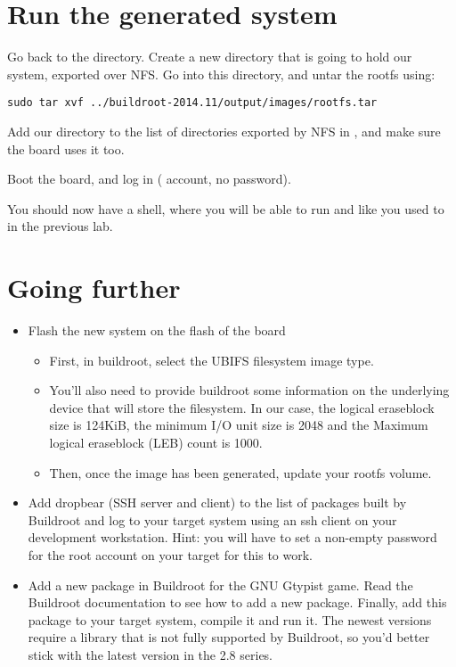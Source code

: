 \section{Run the generated system}

Go back to the  directory. Create
a new  directory that is going to hold our system,
exported over NFS. Go into this directory, and untar the rootfs using:

\begin{verbatim}
sudo tar xvf ../buildroot-2014.11/output/images/rootfs.tar
\end{verbatim}

Add our  directory to the list of directories exported
by NFS in , and make sure the board uses it too.

Boot the board, and log in ( account, no password).

You should now have a shell, where you will be able to run
 and  like you used to in the previous
lab.

\section{Going further}

\begin{itemize}

\item Flash the new system on the flash of the board
  \begin{itemize}
  \item First, in buildroot, select the UBIFS filesystem image type.
  \item You'll also need to provide buildroot some information on the
    underlying device that will store the filesystem. In our case, the
    logical eraseblock size is 124KiB, the minimum I/O unit size is
    2048 and the Maximum logical eraseblock (LEB) count is 1000.
  \item Then, once the image has been generated, update your rootfs
    volume.
  \end{itemize}

\item Add dropbear (SSH server and client) to the list of packages
  built by Buildroot and log to your target system using an ssh client
  on your development workstation. Hint: you will have to set a
  non-empty password for the root account on your target for this to
  work.

\item Add a new package in Buildroot for the GNU Gtypist game. Read
  the Buildroot documentation to see how to add a new
  package. Finally, add this package to your target system, compile it
  and run it. The newest versions require a library that is not fully
  supported by Buildroot, so you'd better stick with the latest
  version in the 2.8 series.

\end{itemize}
